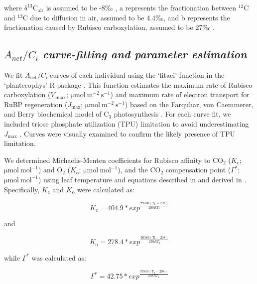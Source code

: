 \noindent where $\mathrm{\delta^{13}C_{air}}$ is assumed to be -8‰ , a represents the fractionation between $\mathrm{^{12}C}$ and $\mathrm{^{13}C}$ due to diffusion in air, assumed to be 4.4‰, and b represents the fractionation caused by Rubisco carboxylation, assumed to be 27‰ .
    
\subsection{$A_{net}/C_i$ \textit{curve-fitting and parameter estimation}}
We fit $A_\mathrm{{net}}/C_\mathrm{i}$ curves of each individual using the ‘fitaci’ function in the ‘plantecophys’ R package . This function estimates the maximum rate of Rubisco carboxylation ($V_{\mathrm{cmax}}$; $\mathrm{\mu mol\ m^{-2}\ s^{-1}}$) and maximum rate of electron transport for RuBP regeneration ($J_{\mathrm{max}}$; $\mathrm{\mu mol\ m^{-2}\ s^{-1}}$) based on the Farquhar, von Caemmerer, and Berry biochemical model of C$_{3}$ photosynthesis . For each curve fit, we included triose phosphate utilization (TPU) limitation to avoid underestimating $J_{\mathrm{max}}$ . Curves were visually examined to confirm the likely presence of TPU limitation. 
    
We determined Michaelis-Menten coefficients for Rubisco affinity to $\mathrm{CO_2}$ ($K_\mathrm{c}$; $\mathrm{\mu mol\ mol^{-1}}$) and $\mathrm{O_2}$ ($K_\mathrm{o}$; $\mathrm{\mu mol\ mol^{-1}}$), and the $\mathrm{CO_2}$ compensation point ($\Gamma^*$; $\mathrm{\mu mol\ mol^{-1}}$) using leaf temperature and equations described in  and derived in . Specifically, $K_\mathrm{c}$ and $K_\mathrm{o}$ were calculated as:

\begin{equation} \label{eq_2.3}
    K_\mathrm{c}=404.9*exp^{\frac{79430(T_\mathrm{k}-298)}{298RT_\mathrm{k}}}
\end{equation}
    
\noindent and
    
\begin{equation} \label{eq_2.4}
    K_\mathrm{o}=278.4*exp^{\frac{36380(T_\mathrm{k}-298)}{298RT_\mathrm{k}}}
\end{equation}
    
\noindent while $\Gamma^*$ was calculated as:
    
\begin{equation} \label{eq_2.5}
    \Gamma^\mathrm{*}=42.75*exp^{\frac{37830(T_\mathrm{k}-298)}{298RT_\mathrm{k}}}
\end{equation}

